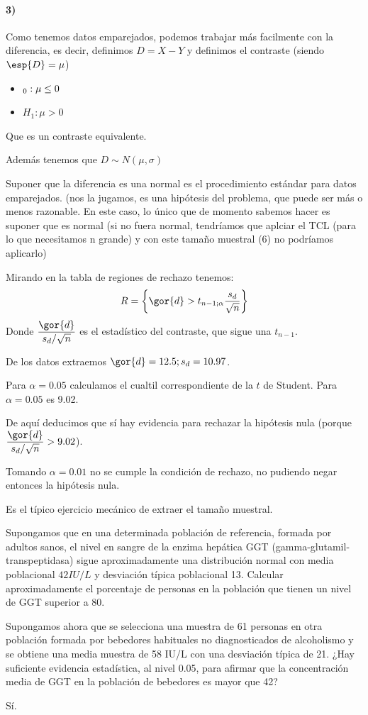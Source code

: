 \begin{problem}[6]
\paragraph{3)} Como tenemos datos emparejados, podemos trabajar más facilmente con la diferencia, es decir, definimos $D=X-Y$ y definimos el contraste (siendo $\esp{D}=\mu$)
\begin{itemize}
\item $\Huge_0 : \mu \leq 0$
\item $H_1: \mu >0$
\end{itemize}

Que es un contraste equivalente.

Además tenemos que $D \sim N(\mu,\sigma)$ 

Suponer que la diferencia es una normal es el procedimiento estándar para datos emparejados. (nos la jugamos, es una hipótesis del problema, que puede ser más o menos razonable. En este caso, lo único que de momento sabemos hacer es suponer que es normal (si no fuera normal, tendríamos que aplciar el TCL (para lo que necesitamos n grande) y con este tamaño muestral (6) no podríamos aplicarlo)

Mirando en la tabla de regiones de rechazo tenemos:
\[R = \left\{\gor{d}> t_{n-1;\alpha} \frac{s_d}{\sqrt{n}}\right\}\]
Donde $\displaystyle \frac{\gor{d}}{s_d/\sqrt{n}}$ es el estadístico del contraste, que sigue una $t_{n-1}$.

De los datos extraemos $\gor{d} = 12.5;s_d=10.97$.

Para $\alpha = 0.05$ calculamos el cualtil correspondiente de la $t$ de Student. Para $\alpha = 0.05$ es 9.02.

De aquí deducimos que sí hay evidencia para rechazar la hipótesis nula (porque  $\displaystyle \frac{\gor{d}}{s_d/\sqrt{n}} > 9.02$).

\spart Tomando $\alpha = 0.01$ no se cumple la condición de rechazo, no pudiendo negar entonces la hipótesis nula.

\spart Es el típico ejercicio mecánico de extraer el tamaño muestral.
\end{problem}


\begin{problem}[8] 

\ppart Supongamos que en una determinada población de referencia, formada por adultos sanos, el nivel en sangre de la enzima hepática GGT (gamma-glutamil-transpeptidasa) sigue aproximadamente una distribución normal con media poblacional $42 IU/L$ y desviación típica poblacional 13. Calcular aproximadamente el porcentaje de personas en la población que tienen un nivel de GGT superior a 80.

\ppart Supongamos ahora que se selecciona una muestra de 61 personas en otra población formada por bebedores habituales no diagnosticados de alcoholismo y se obtiene una media muestra de 58 IU/L con una desviación típica de 21. ¿Hay suficiente evidencia estadística, al nivel 0.05, para afirmar que la concentración media de GGT en la población de bebedores es mayor que 42?

\solution

Sí.

\end{problem}

